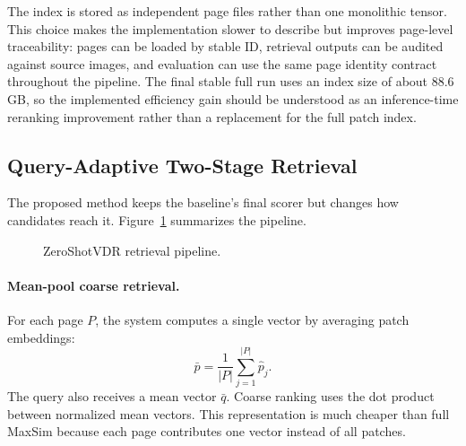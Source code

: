 \documentclass[11pt]{article}
\begin{document}
The index is stored as independent page files rather than one monolithic tensor. This choice makes the implementation slower to describe but improves page-level traceability: pages can be loaded by stable ID, retrieval outputs can be audited against source images, and evaluation can use the same page identity contract throughout the pipeline. The final stable full run uses an index size of about 88.6 GB, so the implemented efficiency gain should be understood as an inference-time reranking improvement rather than a replacement for the full patch index.

\subsection{Query-Adaptive Two-Stage Retrieval}

The proposed method keeps the baseline's final scorer but changes how candidates reach it. Figure~\ref{fig:pipeline} summarizes the pipeline.

\begin{figure}[t]
\centering
\setlength{\fboxsep}{6pt}
\caption{ZeroShotVDR retrieval pipeline.}
\label{fig:pipeline}
\end{figure}

\paragraph{Mean-pool coarse retrieval.}
For each page $P$, the system computes a single vector by averaging patch embeddings:
\begin{equation}
\bar{p}=\frac{1}{|P|}\sum_{j=1}^{|P|}\hat{p}_j .
\end{equation}
The query also receives a mean vector $\bar{q}$. Coarse ranking uses the dot product between normalized mean vectors. This representation is much cheaper than full MaxSim because each page contributes one vector instead of all patches.
\end{document}
